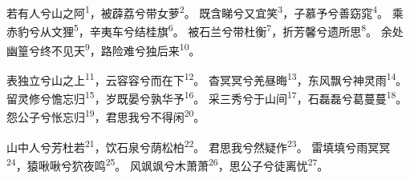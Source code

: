 
\begin{poem}
若有人兮山之阿\textsuperscript{1}，被薜荔兮带女萝\textsuperscript{2}。
既含睇兮又宜笑\textsuperscript{3}，子慕予兮善窈窕\textsuperscript{4}。
乘赤豹兮从文狸\textsuperscript{5}，辛夷车兮结桂旗\textsuperscript{6}。
被石兰兮带杜衡\textsuperscript{7}，折芳馨兮遗所思\textsuperscript{8}。
余处幽篁兮终不见天\textsuperscript{9}，路险难兮独后来\textsuperscript{10}。

表独立兮山之上\textsuperscript{11}，云容容兮而在下\textsuperscript{12}。
杳冥冥兮羌昼晦\textsuperscript{13}，东风飘兮神灵雨\textsuperscript{14}。
留灵修兮憺忘归\textsuperscript{15}，岁既晏兮孰华予\textsuperscript{16}。
采三秀兮于山间\textsuperscript{17}，石磊磊兮葛蔓蔓\textsuperscript{18}。
怨公子兮怅忘归\textsuperscript{19}，君思我兮不得闲\textsuperscript{20}。

山中人兮芳杜若\textsuperscript{21}，饮石泉兮荫松柏\textsuperscript{22}。
君思我兮然疑作\textsuperscript{23}。
雷填填兮雨冥冥\textsuperscript{24}，猿啾啾兮狖夜鸣\textsuperscript{25}。
风飒飒兮木萧萧\textsuperscript{26}，思公子兮徒离忧\textsuperscript{27}。
\end{poem}

